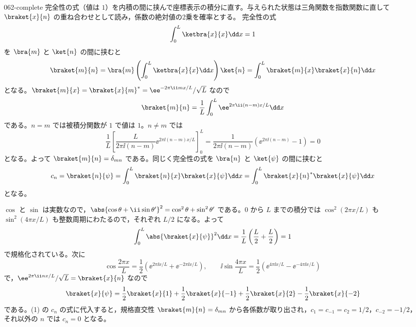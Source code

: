\documentclass[uplatex,dvipdfmx,a4paper,11pt]{jsarticle}
\begin{document}
\begin{kaisetsu}{062-complete}
\houshin 完全性の式（値は $1$）を内積の間に挟んで座標表示の積分に直す。与えられた状態は三角関数を指数関数に直して $\braket{x}{n}$ の重ね合わせとして読み，係数の絶対値の2乗を確率とする。
\keisan {} 完全性の式
\[ \int_{0}^{L}\ketbra{x}{x}\dd x=1 \]
を $\bra{m}$ と $\ket{n}$ の間に挟むと
\[ \braket{m}{n}=\bra{m}\left(\int_{0}^{L}\ketbra{x}{x}\dd x\right)\ket{n}=\int_{0}^{L}\braket{m}{x}\braket{x}{n}\dd x \]
となる。$\braket{m}{x}=\braket{x}{m}^{*}=\ee^{-2\pi\ii mx/L}/\sqrt{L}$ なので
\[ \braket{m}{n}=\frac{1}{L}\int_{0}^{L}\ee^{2\pi\ii(n-m)x/L}\dd x \]
である。$n=m$ では被積分関数が $1$ で値は $1$。$n\neq m$ では
\[ \frac{1}{L}\left[\frac{L}{2\pi\ii(n-m)}\ee^{2\pi\ii(n-m)x/L}\right]_{0}^{L}=\frac{1}{2\pi\ii(n-m)}\left(\ee^{2\pi\ii(n-m)}-1\right)=0 \]
となる。よって $\braket{m}{n}=\delta_{mn}$ である。同じく完全性の式を $\bra{n}$ と $\ket{\psi}$ の間に挟むと
\[ c_{n}=\braket{n}{\psi}=\int_{0}^{L}\braket{n}{x}\braket{x}{\psi}\dd x=\int_{0}^{L}\braket{x}{n}^{*}\braket{x}{\psi}\dd x \]
となる。

 $\cos$ と $\sin$ は実数なので，$\abs{\cos\theta+\ii\sin\theta'}^{2}=\cos^{2}\theta+\sin^{2}\theta'$ である。$0$ から $L$ までの積分では $\cos^{2}(2\pi x/L)$ も $\sin^{2}(4\pi x/L)$ も整数周期にわたるので，それぞれ $L/2$ になる。よって
\[ \int_{0}^{L}\abs{\braket{x}{\psi}}^{2}\dd x=\frac{1}{L}\left(\frac{L}{2}+\frac{L}{2}\right)=1 \]
で規格化されている。次に
\[ \cos\frac{2\pi x}{L}=\frac{1}{2}\left(\ee^{2\pi\ii x/L}+\ee^{-2\pi\ii x/L}\right),\qquad \ii\sin\frac{4\pi x}{L}=\frac{1}{2}\left(\ee^{4\pi\ii x/L}-\ee^{-4\pi\ii x/L}\right) \]
で，$\ee^{2\pi\ii nx/L}/\sqrt{L}=\braket{x}{n}$ なので
\[ \braket{x}{\psi}=\frac{1}{2}\braket{x}{1}+\frac{1}{2}\braket{x}{-1}+\frac{1}{2}\braket{x}{2}-\frac{1}{2}\braket{x}{-2} \]
である。(1) の $c_{n}$ の式に代入すると，規格直交性 $\braket{m}{n}=\delta_{mn}$ から各係数が取り出され，$c_{1}=c_{-1}=c_{2}=1/2$，$c_{-2}=-1/2$，それ以外の $n$ では $c_{n}=0$ となる。


\end{kaisetsu}
\end{document}
